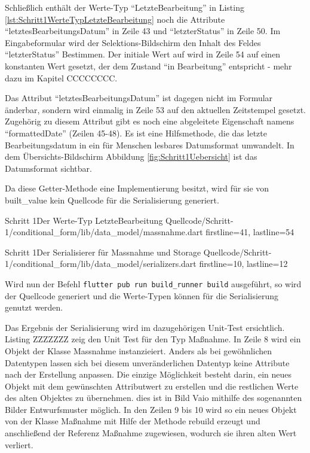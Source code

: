 Schließlich enthält der Werte-Typ \enquote{LetzteBearbeitung} in Listing \ref{lst:Schritt1WerteTypLetzteBearbeitung} noch die Attribute \enquote{letztesBearbeitungsDatum} in Zeile 43 und \enquote{letzterStatus} in Zeile 50. Im Eingabeformular wird der Selektions-Bildschirm den Inhalt des Feldes \enquote{letzterStatus} Bestimmen. Der initiale Wert auf wird in Zeile 54 auf einen konstanten Wert gesetzt, der dem Zustand \enquote{in Bearbeitung} entspricht - mehr dazu im Kapitel CCCCCCCC.

Das Attribut \enquote{letztesBearbeitungsDatum} ist dagegen nicht im Formular änderbar, sondern wird einmalig in Zeile 53 auf den aktuellen Zeitstempel gesetzt. Zugehörig zu diesem Attribut gibt es noch eine abgeleitete Eigenschaft namens \enquote{formattedDate} (Zeilen 45-48).  Es ist eine Hilfsmethode, die das letzte Bearbeitungsdatum in ein für Menschen lesbares Datumsformat umwandelt. In dem Übersichts-Bildschirm Abbildung \ref{fig:Schritt1Uebersicht} ist das Datumsformat sichtbar.

Da diese Getter-Methode eine Implementierung besitzt, wird für sie von built_value kein Quellcode für die Serialisierung generiert.



\begin{alexlisting}{Schritt 1}{Der Werte-Typ LetzteBearbeitung}
  {Quellcode/Schritt-1/conditional_form/lib/data_model/massnahme.dart}
  {firstline=41, lastline=54}
  \label{lst:Schritt1WerteTypLetzteBearbeitung}
\end{alexlisting}


\begin{alexlisting}{Schritt 1}{Der Serialisierer für Massnahme und Storage}
  {Quellcode/Schritt-1/conditional_form/lib/data_model/serializers.dart}
  {firstline=10, lastline=12}
  \label{lst:Schritt1Serialisierer}
\end{alexlisting}



Wird nun der Befehl \texttt{flutter pub run build_runner build} ausgeführt, so wird der Quellcode generiert und die Werte-Typen können für die Serialisierung genutzt werden.

Das Ergebnis der Serialisierung wird im dazugehörigen Unit-Test ersichtlich. Listing ZZZZZZZ zeig den Unit Test für den Typ Maßnahme.
In Zeile 8 wird ein Objekt der Klasse Massnahme instanzieiert. Anders als bei gewöhnlichen Datentypen lassen sich bei diesem unveränderlichen Datentyp keine Attribute nach der Erstellung anpassen. Die einzige Möglichkeit besteht darin, ein neues Objekt  mit dem gewünschten Attributwert zu erstellen und die  restlichen Werte des alten Objektes zu übernehmen.  dies ist in Bild Vaio mithilfe des sogenannten Bilder Entwurfsmuster möglich. In den Zeilen 9 bis 10 wird so ein neues Objekt von der Klasse Maßnahme mit Hilfe der Methode rebuild erzeugt und anschließend der Referenz Maßnahme zugewiesen, wodurch sie ihren alten Wert verliert.





